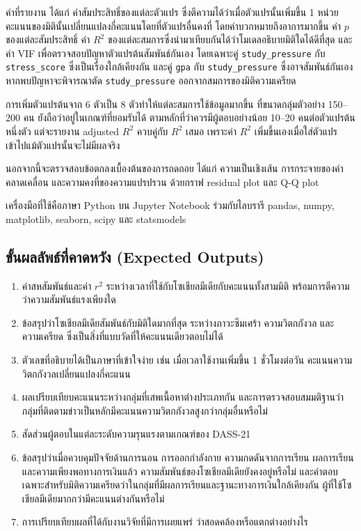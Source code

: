 ค่าที่รายงาน ได้แก่ ค่าสัมประสิทธิ์ของแต่ละตัวแปร ซึ่งตีความได้ว่าเมื่อตัวแปรนั้นเพิ่มขึ้น 1 หน่วย
คะแนนของมิตินั้นเปลี่ยนแปลงกี่คะแนนโดยที่ตัวแปรอื่นคงที่ โดยค่าบวกหมายถึงอาการมากขึ้น
ค่า $p$ ของแต่ละสัมประสิทธิ์ ค่า $R^2$ ของแต่ละสมการซึ่งนำมาเทียบกันได้ว่าโมเดลอธิบายมิติใดได้ดีที่สุด
และค่า VIF เพื่อตรวจสอบปัญหาตัวแปรต้นสัมพันธ์กันเอง
โดยเฉพาะคู่ \texttt{study\_pressure} กับ \texttt{stress\_score} ซึ่งเป็นเรื่องใกล้เคียงกัน
และคู่ \texttt{gpa} กับ \texttt{study\_pressure} ซึ่งอาจสัมพันธ์กันเอง
หากพบปัญหาจะพิจารณาตัด \texttt{study\_pressure} ออกจากสมการของมิติความเครียด

การเพิ่มตัวแปรต้นจาก 6 ตัวเป็น 8 ตัวทำให้แต่ละสมการใช้ข้อมูลมากขึ้น
ที่ขนาดกลุ่มตัวอย่าง 150--200 คน ยังถือว่าอยู่ในเกณฑ์ที่ยอมรับได้
ตามหลักที่ว่าควรมีผู้ตอบอย่างน้อย 10--20 คนต่อตัวแปรต้นหนึ่งตัว
แต่จะรายงาน adjusted $R^2$ ควบคู่กับ $R^2$ เสมอ
เพราะค่า $R^2$ เพิ่มขึ้นเองเมื่อใส่ตัวแปรเข้าไปแม้ตัวแปรนั้นจะไม่มีผลจริง

นอกจากนี้จะตรวจสอบข้อตกลงเบื้องต้นของการถดถอย ได้แก่ ความเป็นเชิงเส้น
การกระจายของค่าคลาดเคลื่อน และความคงที่ของความแปรปรวน
ด้วยกราฟ residual plot และ Q-Q plot

เครื่องมือที่ใช้คือภาษา Python บน Jupyter Notebook ร่วมกับไลบรารี
pandas, numpy, matplotlib, seaborn, scipy และ statsmodels

\subsection{ขั้นผลลัพธ์ที่คาดหวัง (Expected Outputs)}

\begin{enumerate}[label=\arabic*),leftmargin=1.9cm,itemsep=0.15em,topsep=0.2em]
    \item ค่าสหสัมพันธ์และค่า $r^2$ ระหว่างเวลาที่ใช้กับโซเชียลมีเดียกับคะแนนทั้งสามมิติ พร้อมการตีความว่าความสัมพันธ์แรงเพียงใด
    \item ข้อสรุปว่าโซเชียลมีเดียสัมพันธ์กับมิติใดมากที่สุด ระหว่างภาวะซึมเศร้า ความวิตกกังวล และความเครียด ซึ่งเป็นสิ่งที่แบบวัดที่ให้คะแนนเดียวตอบไม่ได้
    \item ตัวเลขที่อธิบายได้เป็นภาษาที่เข้าใจง่าย เช่น เมื่อเวลาใช้งานเพิ่มขึ้น 1 ชั่วโมงต่อวัน คะแนนความวิตกกังวลเปลี่ยนแปลงกี่คะแนน
    \item ผลเปรียบเทียบคะแนนระหว่างกลุ่มที่เสพเนื้อหาต่างประเภทกัน และการตรวจสอบสมมติฐานว่ากลุ่มที่ติดตามข่าวเป็นหลักมีคะแนนความวิตกกังวลสูงกว่ากลุ่มอื่นหรือไม่
    \item สัดส่วนผู้ตอบในแต่ละระดับความรุนแรงตามเกณฑ์ของ DASS-21
    \item ข้อสรุปว่าเมื่อควบคุมปัจจัยด้านการนอน การออกกำลังกาย ความกดดันจากการเรียน ผลการเรียน และความเพียงพอทางการเงินแล้ว ความสัมพันธ์ของโซเชียลมีเดียยังคงอยู่หรือไม่ และคำตอบเฉพาะสำหรับมิติความเครียดว่าในกลุ่มที่มีผลการเรียนและฐานะทางการเงินใกล้เคียงกัน ผู้ที่ใช้โซเชียลมีเดียมากกว่ามีคะแนนต่างกันหรือไม่
    \item การเปรียบเทียบผลที่ได้กับงานวิจัยที่มีการเผยแพร่ ว่าสอดคล้องหรือแตกต่างอย่างไร
\end{enumerate}

